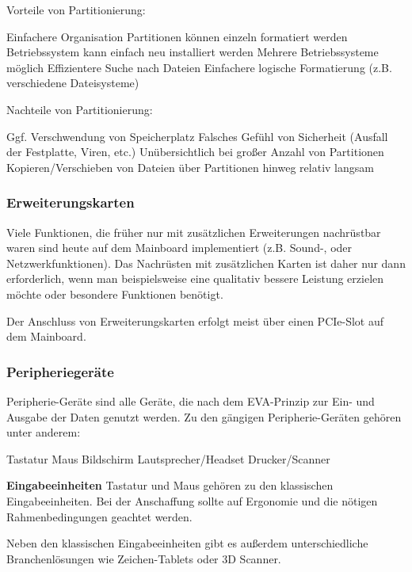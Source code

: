 \documentclass[10pt]{article}
\begin{document}
\begin{flushleft}
Vorteile von Partitionierung:
\begin{outline}
    \1 Einfachere Organisation
    \1 Partitionen können einzeln formatiert werden
    \1 Betriebssystem kann einfach neu installiert werden
    \1 Mehrere Betriebssysteme möglich
    \1 Effizientere Suche nach Dateien
    \1 Einfachere logische Formatierung (z.B. verschiedene Dateisysteme)
\end{outline}

Nachteile von Partitionierung:
\begin{outline}
    \1 Ggf. Verschwendung von Speicherplatz
    \1 Falsches Gefühl von Sicherheit (Ausfall der Festplatte, Viren, etc.)
    \1 Unübersichtlich bei großer Anzahl von Partitionen
    \1 Kopieren/Verschieben von Dateien über Partitionen hinweg relativ langsam
\end{outline}

\subsubsection{Erweiterungskarten}
Viele Funktionen, die früher nur mit zusätzlichen Erweiterungen nachrüstbar waren sind heute auf dem Mainboard implementiert (z.B. Sound-, oder Netzwerkfunktionen). Das Nachrüsten mit zusätzlichen Karten ist daher nur dann erforderlich, wenn man beispielsweise eine qualitativ bessere Leistung erzielen möchte oder besondere Funktionen benötigt.

Der Anschluss von Erweiterungskarten erfolgt meist über einen PCIe-Slot auf dem Mainboard.

\subsubsection{Peripheriegeräte}
Peripherie-Geräte sind alle Geräte, die nach dem EVA-Prinzip zur Ein- und Ausgabe der Daten genutzt werden. Zu den gängigen Peripherie-Geräten gehören unter anderem:
\begin{outline}
    \1 Tastatur
    \1 Maus
    \1 Bildschirm
    \1 Lautsprecher/Headset
    \1 Drucker/Scanner
\end{outline}

\textbf{Eingabeeinheiten}
Tastatur und Maus gehören zu den klassischen Eingabeeinheiten. Bei der Anschaffung sollte auf Ergonomie und die nötigen Rahmenbedingungen geachtet werden.

Neben den klassischen Eingabeeinheiten gibt es außerdem unterschiedliche Branchenlösungen wie Zeichen-Tablets oder 3D Scanner.


\end{flushleft}
\end{document}
